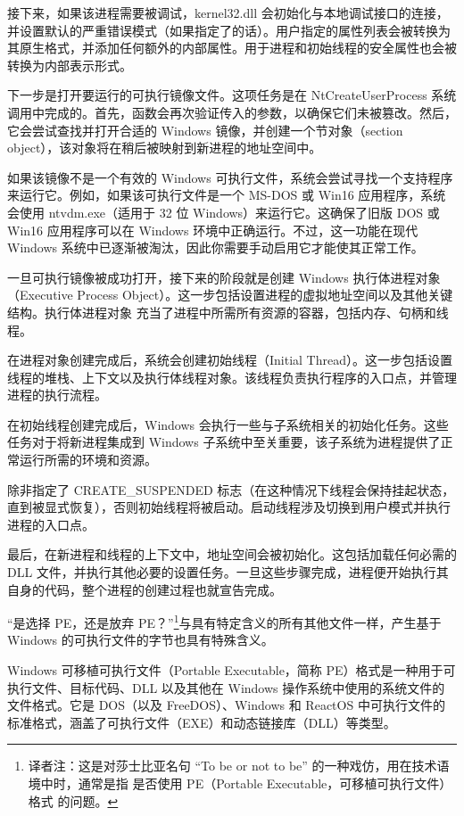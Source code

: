 接下来，如果该进程需要被调试，kernel32.dll 会初始化与本地调试接口的连接，并设置默认的严重错误模式（如果指定了的话）。用户指定的属性列表会被转换为其原生格式，并添加任何额外的内部属性。用于进程和初始线程的安全属性也会被转换为内部表示形式。

下一步是打开要运行的可执行镜像文件。这项任务是在 NtCreateUserProcess 系统调用中完成的。首先，函数会再次验证传入的参数，以确保它们未被篡改。然后，它会尝试查找并打开合适的 Windows 镜像，并创建一个节对象（section object），该对象将在稍后被映射到新进程的地址空间中。

如果该镜像不是一个有效的 Windows 可执行文件，系统会尝试寻找一个支持程序来运行它。例如，如果该可执行文件是一个 MS-DOS 或 Win16 应用程序，系统会使用 ntvdm.exe（适用于 32 位 Windows）来运行它。这确保了旧版 DOS 或 Win16 应用程序可以在 Windows 环境中正确运行。不过，这一功能在现代 Windows 系统中已逐渐被淘汰，因此你需要手动启用它才能使其正常工作。

一旦可执行镜像被成功打开，接下来的阶段就是创建 Windows 执行体进程对象（Executive Process Object）。这一步包括设置进程的虚拟地址空间以及其他关键结构。执行体进程对象 充当了进程中所需所有资源的容器，包括内存、句柄和线程。

在进程对象创建完成后，系统会创建初始线程（Initial Thread）。这一步包括设置线程的堆栈、上下文以及执行体线程对象。该线程负责执行程序的入口点，并管理进程的执行流程。

在初始线程创建完成后，Windows 会执行一些与子系统相关的初始化任务。这些任务对于将新进程集成到 Windows 子系统中至关重要，该子系统为进程提供了正常运行所需的环境和资源。

除非指定了 CREATE\_SUSPENDED 标志（在这种情况下线程会保持挂起状态，直到被显式恢复），否则初始线程将被启动。启动线程涉及切换到用户模式并执行进程的入口点。

最后，在新进程和线程的上下文中，地址空间会被初始化。这包括加载任何必需的 DLL 文件，并执行其他必要的设置任务。一旦这些步骤完成，进程便开始执行其自身的代码，整个进程的创建过程也就宣告完成。


“是选择 PE，还是放弃 PE？”\footnote{译者注：这是对莎士比亚名句 “To be or not to be” 的一种戏仿，用在技术语境中时，通常是指 是否使用 PE（Portable Executable，可移植可执行文件）格式 的问题。}与具有特定含义的所有其他文件一样，产生基于 Windows 的可执行文件的字节也具有特殊含义。

Windows 可移植可执行文件（Portable Executable，简称 PE）格式是一种用于可执行文件、目标代码、DLL 以及其他在 Windows 操作系统中使用的系统文件的文件格式。它是 DOS（以及 FreeDOS）、Windows 和 ReactOS 中可执行文件的标准格式，涵盖了可执行文件（EXE）和动态链接库（DLL）等类型。

